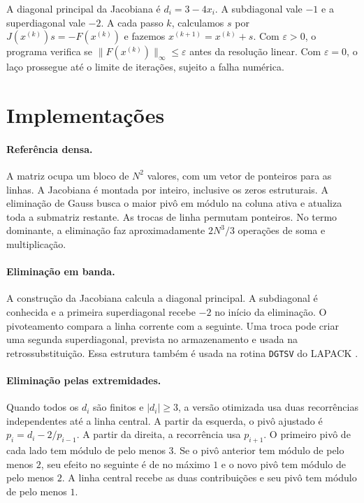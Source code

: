 \documentclass[11pt,a4paper]{article}
\begin{document}
A diagonal principal da Jacobiana é $d_i=3-4x_i$. A subdiagonal vale
$-1$ e a superdiagonal vale $-2$. A cada passo $k$, calculamos $s$ por
$J(x^{(k)})s=-F(x^{(k)})$ e fazemos $x^{(k+1)}=x^{(k)}+s$.
Com $\varepsilon>0$, o programa verifica se $\|F(x^{(k)})\|_\infty
\leq\varepsilon$ antes da resolução linear. Com $\varepsilon=0$, o
laço prossegue até o limite de iterações, sujeito a falha numérica.

\clearpage
\section{Implementações}

\paragraph{Referência densa.} A matriz ocupa um bloco de $N^2$ valores,
com um vetor de ponteiros para as linhas. A Jacobiana é montada por
inteiro, inclusive os zeros estruturais. A eliminação de Gauss busca
o maior pivô em módulo na coluna ativa e atualiza toda a submatriz
restante. As trocas de linha permutam ponteiros. No termo dominante,
a eliminação faz aproximadamente $2N^3/3$ operações de soma e
multiplicação.

\paragraph{Eliminação em banda.} A construção da Jacobiana calcula
a diagonal principal. A subdiagonal é conhecida e a primeira
superdiagonal recebe $-2$ no início da eliminação. O pivoteamento
compara a linha corrente com a seguinte. Uma troca pode criar uma
segunda superdiagonal, prevista no armazenamento e usada na
retrossubstituição. Essa estrutura também é usada na rotina
\texttt{DGTSV} do LAPACK \cite{lapack}.

\paragraph{Eliminação pelas extremidades.} Quando todos os $d_i$ são
finitos e $|d_i|\geq 3$, a versão otimizada usa duas recorrências
independentes até a linha central. A partir da esquerda, o pivô
ajustado é $p_i=d_i-2/p_{i-1}$. A partir da direita, a recorrência
usa $p_{i+1}$. O primeiro pivô de cada lado tem módulo de pelo menos
$3$. Se o pivô anterior tem módulo de pelo menos $2$, seu efeito no
seguinte é de no máximo $1$ e o novo pivô tem módulo de pelo menos
$2$. A linha central recebe as duas contribuições e seu pivô tem
módulo de pelo menos $1$.
\end{document}
